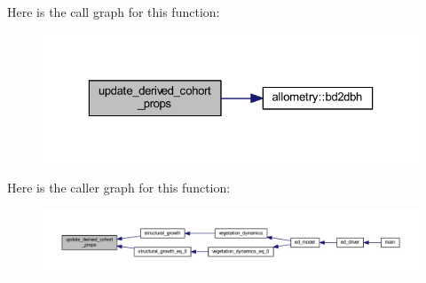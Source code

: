 Here is the call graph for this function\+:\nopagebreak
\begin{figure}[H]
\begin{center}
\leavevmode
\includegraphics[width=323pt]{structural__growth_8f90_a536c2986535dd42c3f2fd77510acf2f3_cgraph}
\end{center}
\end{figure}




Here is the caller graph for this function\+:\nopagebreak
\begin{figure}[H]
\begin{center}
\leavevmode
\includegraphics[width=350pt]{structural__growth_8f90_a536c2986535dd42c3f2fd77510acf2f3_icgraph}
\end{center}
\end{figure}


